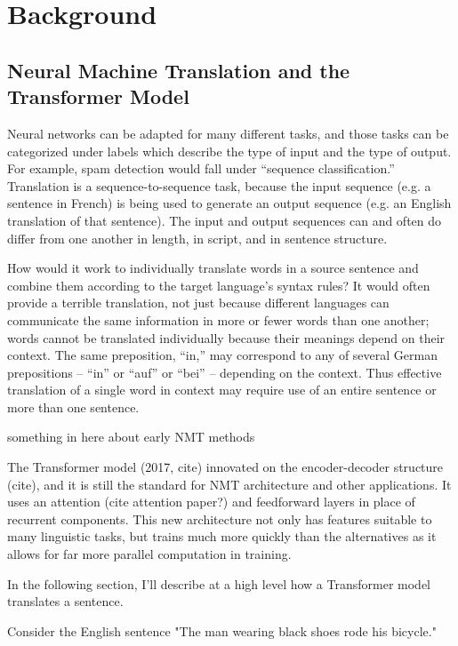 \chapter{Background}
\label{chap:background}

\section{Neural Machine Translation and the Transformer Model}

Neural networks can be adapted for many different tasks, and those tasks can be categorized under 
labels which describe the type of input and the type of output. For example, spam detection would 
fall under “sequence classification.” Translation is a sequence-to-sequence task, because the input 
sequence (e.g. a sentence in French) is being used to generate an output sequence (e.g. an English 
translation of that sentence). The input and output sequences can and often do differ from one another 
in length, in script, and in sentence structure. 

How would it work to individually translate words in a source sentence and combine them according to 
the target language’s syntax rules? It would often provide a terrible translation, not just because 
different languages can communicate the same information in more or fewer words than one another; words 
cannot be translated individually because their meanings depend on their context. The same preposition, 
“in,” may correspond to any of several German prepositions – “in” or “auf” or “bei” – depending on the 
context. Thus effective translation of a single word in context may require use of an entire sentence or 
more than one sentence. 

something in here about early NMT methods

The Transformer model (2017, cite) innovated on the encoder-decoder structure (cite), and it is still the standard for NMT 
architecture and other applications. It uses an attention (cite attention paper?) and feedforward layers in place of recurrent components. 
This new architecture not only has features suitable to many linguistic tasks, but trains much more quickly 
than the alternatives as it allows for far more parallel computation in training. 

In the following section, I'll describe at a high level how a Transformer model translates a sentence. 

Consider the English sentence "The man wearing black shoes rode his bicycle."

